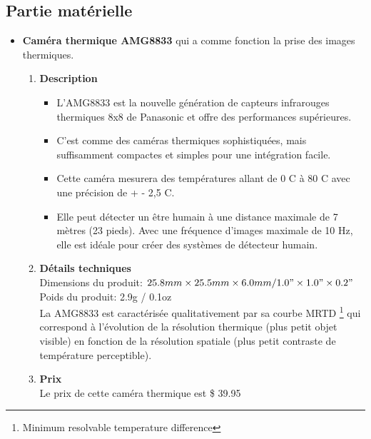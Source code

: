 \documentclass[12pt]{article}
\begin{document}
\subsection{Partie matérielle}
\begin{itemize}
	\item \textbf{Caméra thermique AMG8833} \cite{45} qui a comme fonction la prise des images thermiques.
	\begin{enumerate}
	\item \textbf{Description}\\
	\begin{itemize}
	\item L'AMG8833 est la nouvelle génération de capteurs infrarouges thermiques 8x8 de Panasonic et offre des performances supérieures.
	\item C'est comme des caméras thermiques sophistiquées, mais suffisamment compactes et simples pour une intégration facile.
	\item Cette caméra mesurera des températures allant de 0 C\textdegree{} à 80 C\textdegree{} avec une précision de + - 2,5 C\textdegree{}. 
	\item Elle peut détecter un être humain à une distance maximale de 7 mètres (23 pieds). Avec une fréquence d'images maximale de 10 Hz, elle est idéale pour créer des systèmes de détecteur humain.
	\end{itemize}
	\item \textbf{Détails techniques}\\
	Dimensions du produit: $25.8mm \times 25.5mm \times 6.0mm / 1.0 " \times 1.0" \times 0.2 "$\\
	Poids du produit: 2.9g / 0.1oz\\
	
	La AMG8833 est caractérisée qualitativement par sa courbe MRTD \footnote{Minimum resolvable temperature difference} qui correspond à l’évolution de la résolution thermique (plus petit objet visible) en fonction de la résolution spatiale (plus petit contraste de température perceptible).
	\item \textbf{Prix}\\
	Le prix de cette caméra thermique est  \$ 39.95  
\end{enumerate}	 


\end{itemize}
\end{document}
